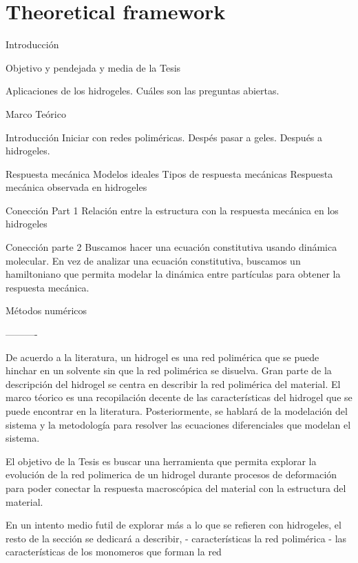 \chapter{Theoretical framework}


Introducción

Objetivo y pendejada y media de la Tesis

Aplicaciones de los hidrogeles.
Cuáles son las preguntas abiertas.



Marco Teórico

Introducción
Iniciar con redes poliméricas.
Despés pasar a geles.
Después a hidrogeles.

Respuesta mecánica
Modelos ideales
Tipos de respuesta mecánicas
Respuesta mecánica observada en hidrogeles

Conección Part 1
Relación entre la estructura con la respuesta mecánica en los hidrogeles

Conección parte 2
Buscamos hacer una ecuación constitutiva usando dinámica molecular.
En vez de analizar una ecuación constitutiva, buscamos un hamiltoniano que permita modelar la dinámica entre partículas para obtener la respuesta mecánica.


Métodos numéricos

----------

De acuerdo a la literatura, un hidrogel es una red polimérica que se puede hinchar en un solvente sin que la red polimérica se disuelva.
Gran parte de la descripción del hidrogel se centra en describir la red polimérica del material.
El marco téorico es una recopilación decente de las características del hidrogel que se puede encontrar en la literatura.
Posteriormente, se hablará de la modelación del sistema y la metodología para resolver las ecuaciones diferenciales que modelan el sistema.

El objetivo de la Tesis es buscar una herramienta que permita explorar la evolución de la red polimerica de un hidrogel durante procesos de deformación para poder conectar la respuesta macroscópica del material con la estructura del material.


En un intento medio futil de explorar más a lo que se refieren con hidrogeles, el resto de la sección se dedicará a describir,
- características la red polimérica
- las características de los monomeros que forman la red

